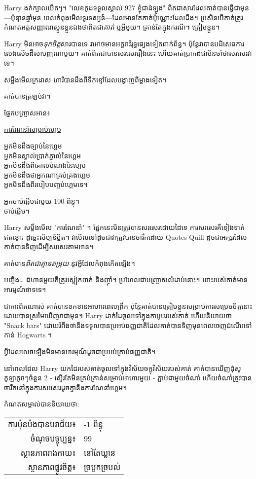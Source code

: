 Harry ងក់ក្បាលយឺតៗ។ "លេខកូដទទួលស្គាល់ 927 ខ្ញុំជាដំឡូង" ពិត​ជា​សារ​ដែល​គាត់​បាន​ធ្វើ​ជា​មុន—ប៉ុន្មាន​ឆ្នាំ​មុន ពេល​កំពុង​មើល​ទូរទស្សន៍—ដែល​មាន​តែ​គាត់​ប៉ុណ្ណោះ​ដែល​ដឹង។ ប្រសិនបើគាត់ត្រូវកំណត់អត្តសញ្ញាណស្ទួនខ្លួនឯងថាពិតជា\emph{គាត់} ឬអ្វីមួយ។ គ្រាន់តែក្នុងករណី។ ត្រៀមខ្លួន។

Harry មិនអាច\emph{ទុកចិត្ត}សារបានទេ វាអាចមានអក្ខរាវិរុទ្ធផ្សេងទៀតពាក់ព័ន្ធ។ ប៉ុន្តែ​វា​បាន​បដិសេធ​ការ​លេងសើច​ដ៏​សាមញ្ញ​ណាមួយ​។ គាត់ពិតជាបានសរសេររឿងនេះ ហើយគាត់ប្រាកដជាមិនចាំថាសរសេរវាទេ។

សម្លឹងមើលក្រដាស ហារីបានដឹងពីទឹកខ្មៅដែលបង្ហាញពីម្ខាងទៀត។

គាត់បានត្រឡប់វា។

ផ្នែកបញ្ច្រាសអាន៖

\begin{writtenNote}
\underline{ការណែនាំសម្រាប់ហ្គេម}

អ្នកមិនដឹងច្បាប់នៃហ្គេម \\
អ្នកមិនស្គាល់ប្រាក់ភ្នាល់នៃហ្គេម \\
អ្នកមិនដឹងពីគោលបំណងនៃហ្គេម \\
អ្នកមិនដឹងថាអ្នកណាគ្រប់គ្រងហ្គេម \\
អ្នកមិនដឹងពីរបៀបបញ្ចប់ហ្គេមទេ។

អ្នកចាប់ផ្តើមជាមួយ 100 ពិន្ទុ។\\
ចាប់ផ្តើម។
\end{writtenNote}

Harry សម្លឹងមើល "ការណែនាំ" ។ ផ្នែកនេះមិនត្រូវបានសរសេរដោយដៃទេ ការសរសេរគឺទៀងទាត់ឥតខ្ចោះ ដូច្នេះសិប្បនិម្មិត។ វាមើលទៅដូចជាវាត្រូវបានចារឹកដោយ Quotes Quill ដូចជាអក្សរដែលគាត់បានទិញដើម្បីសរសេរតាមអាន។

គាត់មាន\emph{ពិតជាគ្មានតម្រុយ} នូវអ្វីដែលកំពុងកើតឡើង។

អញ្ចឹង… ជំហានមួយគឺត្រូវស្លៀកពាក់ និងញ៉ាំ។ ប្រហែលជាបញ្ច្រាសលំដាប់នោះ។ ពោះរបស់គាត់មានអារម្មណ៍ថាទទេ។

ជា​ការ​ពិត​ណាស់ គាត់​បាន​ខកខាន​អាហារ​ពេល​ព្រឹក ប៉ុន្តែ​គាត់​បាន​ត្រៀម​ខ្លួន​សម្រាប់​ការ​សម្រេច​ចិត្ត​នោះ ដោយ​បាន​ស្រមៃ​ឃើញ​វា​ជា​មុន។ Harry ដាក់ដៃចូលទៅក្នុងកាបូបរបស់គាត់ ហើយនិយាយថា "Snack bars" ដោយរំពឹងថានឹងទទួលបានប្រអប់ធញ្ញជាតិដែលគាត់បានទិញមុនពេលចេញដំណើរទៅកាន់ Hogwarts ។

អ្វី​ដែល​លេច​ឡើង​មិន​មាន​អារម្មណ៍​ដូច​ជា​ប្រអប់​គ្រាប់​ធញ្ញជាតិ។

នៅពេលដែល Harry យកដៃរបស់គាត់ចូលទៅក្នុងវិស័យចក្ខុវិស័យរបស់គាត់ គាត់បានឃើញដុំសូកូឡាតូចៗចំនួន 2 - ស្ទើរតែមិនគ្រប់គ្រាន់សម្រាប់អាហារមួយ - ភ្ជាប់ជាមួយចំណាំ ហើយចំណាំត្រូវបានចារឹកនៅក្នុងការសរសេរដូចគ្នានឹងការណែនាំហ្គេម។

កំណត់សម្គាល់បាននិយាយថា:
\begin{writtenNote}
\begin{tabular}{rl}
ការប៉ុនប៉ងបានបរាជ័យ៖ & -1 ពិន្ទុ\\
ចំណុចបច្ចុប្បន្ន៖ & 99\\
ស្ថានភាពរាងកាយ៖ & នៅតែឃ្លាន\\
ស្ថានភាពផ្លូវចិត្ត៖ & ច្របូកច្របល់
\end{tabular}
\end{writtenNote}

